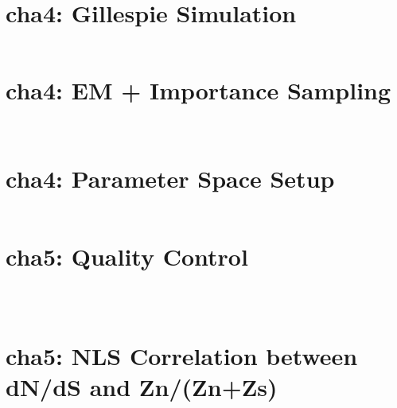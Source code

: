 \section*{\normalfont cha4: Gillespie Simulation}
\inputminted[breaklines, breakanywhere, tabsize=2]{r}{scripts/haha_gillespie100.R}

\section*{\normalfont cha4: EM + Importance Sampling}
\inputminted[breaklines, breakanywhere, tabsize=2]{r}{scripts/phase_im_sampling_1e4.R}
\newpage
\inputminted[breaklines, breakanywhere, tabsize=2]{r}{scripts/phase_indel_prob3.R}

\section*{\normalfont cha4: Parameter Space Setup}
\inputminted[breaklines, breakanywhere, tabsize=2]{r}{scripts/para_space.R}


\section*{\normalfont cha5: Quality Control}
\inputminted[breaklines, breakanywhere, tabsize=2]{r}{scripts/fitem.R}
\newpage
\inputminted[breaklines, breakanywhere, tabsize=2]{r}{scripts/suppl.Rmd}
\newpage
\inputminted[breaklines, breakanywhere, tabsize=2]{r}{scripts/make_suppl.R}

\section*{\normalfont cha5: NLS Correlation between dN/dS and Zn/(Zn+Zs)}
\inputminted[breaklines, breakanywhere, tabsize=2]{r}{scripts/roll_ZnZs_nls.R}
